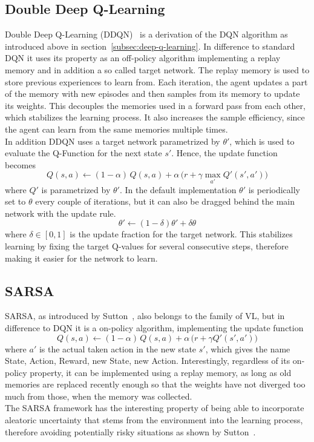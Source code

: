 \documentclass[11pt,a4paper]{article}
\begin{document}
	\subsection{Double Deep Q-Learning}\label{subsec:double-deep-q-learning}
	Double Deep Q-Learning (DDQN)~\cite{van_hasselt_deep_2015} is a derivation of the DQN algorithm as introduced above in section~\ref{subsec:deep-q-learning}.
	In difference to standard DQN it uses its property as an off-policy algorithm implementing a replay memory and in addition a so called target network.
	The replay memory is used to store previous experiences to learn from.
	Each iteration, the agent updates a part of the memory with new episodes and then samples from its memory to update its weights.
	This decouples the memories used in a forward pass from each other, which stabilizes the learning process.
	It also increases the sample efficiency, since the agent can learn from the same memories multiple times.\\

	In addition DDQN uses a target network parametrized by $\theta'$, which is used to evaluate the Q-Function for the next state $s'$.
	Hence, the update function becomes
	\[Q(s,a) \leftarrow (1-\alpha)\, Q(s,a) + \alpha\,\Big(r + \gamma \max_{a'}Q'(s', a')\Big)\]
	where $Q'$ is parametrized by $\theta'$.
	In the default implementation $\theta'$ is periodically set to $\theta$ every couple of iterations, but it can also be dragged behind the main network with the update rule.
	\[\theta' \leftarrow (1 - \delta) \theta' + \delta \theta\]
	where $\delta \in [0,1]$ is the update fraction for the target network.
	This stabilizes learning by fixing the target Q-values for several consecutive steps, therefore making it easier for the network to learn.\\

	\subsection{SARSA}\label{subsec:sarsa}
	SARSA, as introduced by Sutton~\cite{sutton_introduction_1998}, also belongs to the family of VL, but in difference to DQN it is a on-policy algorithm, implementing the update function
	\[Q(s,a) \leftarrow (1-\alpha)\, Q(s,a) + \alpha\,\Big(r + \gamma Q'(s', a')\Big)\]
	where $a'$ is the actual taken action in the new state $s'$, which gives the name State, Action, Reward, new State, new Action.
	Interestingly, regardless of its on-policy property, it can be implemented using a replay memory, as long as  old memories are replaced recently enough so that the weights have not diverged too much from those, when the memory was collected.\\
	The SARSA framework has the interesting property of being able to incorporate aleatoric uncertainty that stems from the environment into the learning process, therefore avoiding potentially risky situations as shown by Sutton~\cite{sutton_introduction_1998}.\\
\end{document}
